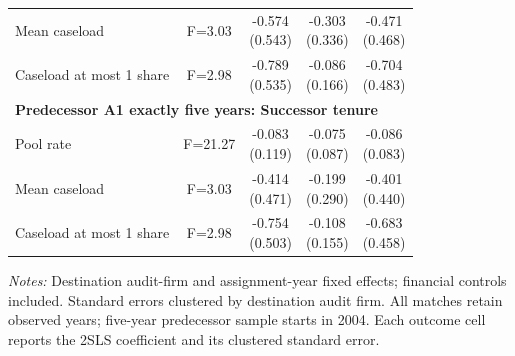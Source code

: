 \begin{table}[htbp]
\begin{threeparttable}
\begin{tabular}{p{}cccc}
Mean caseload & F=3.03 & \shortstack{-0.574\\(0.543)} & \shortstack{-0.303\\(0.336)} & \shortstack{-0.471\\(0.468)} \\
Caseload at most 1 share & F=2.98 & \shortstack{-0.789\\(0.535)} & \shortstack{-0.086\\(0.166)} & \shortstack{-0.704\\(0.483)} \\
\multicolumn{5}{l}{\textbf{Predecessor A1 exactly five years: Successor tenure}} \\
Pool rate & F=21.27 & \shortstack{-0.083\\(0.119)} & \shortstack{-0.075\\(0.087)} & \shortstack{-0.086\\(0.083)} \\
Mean caseload & F=3.03 & \shortstack{-0.414\\(0.471)} & \shortstack{-0.199\\(0.290)} & \shortstack{-0.401\\(0.440)} \\
Caseload at most 1 share & F=2.98 & \shortstack{-0.754\\(0.503)} & \shortstack{-0.108\\(0.155)} & \shortstack{-0.683\\(0.458)} \\
\bottomrule
\end{tabular}
\begin{tablenotes}\footnotesize
\item \raggedright \textit{Notes:} Destination audit-firm and assignment-year fixed effects; financial controls included. Standard errors clustered by destination audit firm. All matches retain observed years; five-year predecessor sample starts in 2004. Each outcome cell reports the 2SLS coefficient and its clustered standard error.
\end{tablenotes}
\end{threeparttable}
\end{table}
